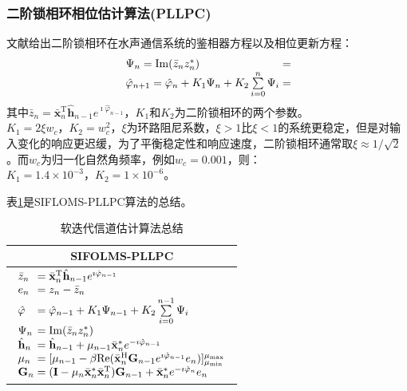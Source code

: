 \subsubsection*{二阶锁相环相位估计算法(PLLPC)}
文献给出二阶锁相环在水声通信系统的鉴相器方程以及相位更新方程：
\begin{eqnarray}
    \begin{array}{l@{\;=\;}l}
    \Psi_n=\mathrm{Im}(\bar{z}_nz_n^*)\\
    \hat{\varphi}_{n+1}=\hat{\varphi}_n+K_1\Psi_n+K_2\sum\limits_{i=0}^n\Psi_i
    \end{array}
    \label{equ:4.21}
\end{eqnarray}
其中$\bar{z}_n=\bar{\mathbf{x}}_n^{\mathrm{T}}\hat{\mathbf{h}}_{n-1}e^{\imath\hat{\varphi}_{n-1}}$，$K_1$和$K_2$为二阶锁相环的两个参数。$K_1=2\xi w_c\mbox{，}K_2=w_c^2$，$\xi$为环路阻尼系数，$\xi>1$比$\xi<1$的系统更稳定，但是对输入变化的响应更迟缓，为了平衡稳定性和响应速度，二阶锁相环通常取$\xi\approx
1/\sqrt{2}$。而$w_c$为归一化自然角频率，例如$w_c=0.001$，则：$K_1=1.4\times
10^{-3}\mbox{，}K_2=1\times 10^{-6}$。

表\ref{tab:4.1}是SIFLOMS-PLLPC算法的总结。
\begin{table}[hbt]
  \centering
  \caption{软迭代信道估计算法总结}
  \label{tab:4.1}
  \begin{threeparttable}
  \begin{tabular}{c}
    \hline
    SIFOLMS-PLLPC\\
    \hline
    $
    \begin{array}{l@{\;=\;}l}
        \bar{z}_n&\bar{\mathbf{x}}_n^{\mathrm{T}}\hat{\mathbf{h}}_{n-1}e^{\imath\hat{\varphi}_{n-1}}\\
        e_n&z_n-\bar{z}_n\\
        \hat{\varphi}&\hat{\varphi}_{n-1}+K_1\Psi_{n-1}+K_2\sum\limits_{i=0}^{n-1}\Psi_i\\
        \Psi_n&\mathrm{Im}(\bar{z}_nz_n^*)\\
        \hat{\mathbf{h}}_n&\hat{\mathbf{h}}_{n-1}+\mu_{n-1}\bar{\mathbf{x}}_{n}^*e^{-\imath\hat{\varphi}_{n-1}}\\
        \mu_n&[\mu_{n-1}-\beta\mathrm{Re}(\bar{\mathbf{x}}_n^{\mathrm{H}}\mathbf{G}_{n-1}e^{\imath\hat{\varphi}_{n-1}}e_n)]_{\mu_{\min}}^{\mu_{\max}}\\
        \mathbf{G}_n&(\mathbf{I}-\mu_n\bar{\mathbf{x}}_n^*\bar{\mathbf{x}}_n^{\mathrm{T}})\mathbf{G}_{n-1}+\bar{\mathbf{x}}_n^*e^{-\imath\hat{\varphi}_n}e_n\\
    \end{array}
    $\\
    \hline
  \end{tabular}
\end{threeparttable}
\end{table}

